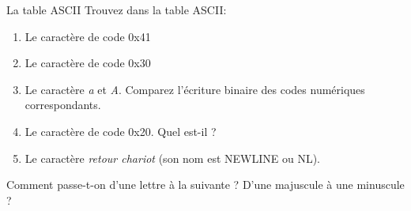\begin{exercice}
  \begin{exercicelet}{La table ASCII}
    Trouvez dans la table ASCII:
    \begin{enumerate}
    \item Le caractère de code 0x41
    \item Le caractère de code 0x30
    \item Le caractère \emph{a} et \emph{A}. Comparez l'écriture binaire des codes numériques correspondants.
    \item Le caractère de code 0x20. Quel est-il ?
    \item Le caractère \emph{retour chariot} (son nom est NEWLINE ou NL).
    \end{enumerate}
    Comment passe-t-on d'une lettre à la suivante ? D'une majuscule à une
    minuscule ?
  \end{exercicelet}
\end{exercice}
